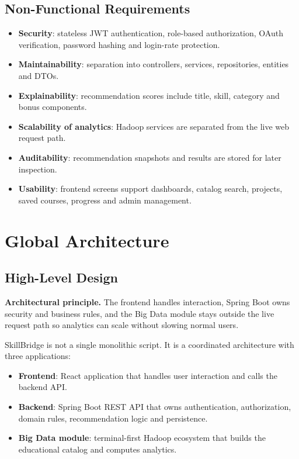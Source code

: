 \documentclass[12pt,a4paper]{report}
\newcommand{\reportnote}[2]{
    \begin{tcolorbox}[
        enhanced,
        colback=#1!10,
        colframe=#1,
        arc=2pt,
        boxrule=0.7pt,
        left=8pt,
        right=8pt,
        top=7pt,
        bottom=7pt
    ]
    #2
    \end{tcolorbox}
}
\newcommand{\projectName}{SkillBridge}
\begin{document}
\section{Non-Functional Requirements}
\begin{itemize}[leftmargin=*]
    \item \textbf{Security}: stateless JWT authentication, role-based authorization, OAuth verification, password hashing and login-rate protection.
    \item \textbf{Maintainability}: separation into controllers, services, repositories, entities and DTOs.
    \item \textbf{Explainability}: recommendation scores include title, skill, category and bonus components.
    \item \textbf{Scalability of analytics}: Hadoop services are separated from the live web request path.
    \item \textbf{Auditability}: recommendation snapshots and results are stored for later inspection.
    \item \textbf{Usability}: frontend screens support dashboards, catalog search, projects, saved courses, progress and admin management.
\end{itemize}

\chapter{Global Architecture}

\section{High-Level Design}
\reportnote{sbNavy}{\textbf{Architectural principle.} The frontend handles interaction, Spring Boot owns security and business rules, and the Big Data module stays outside the live request path so analytics can scale without slowing normal users.}

\projectName{} is not a single monolithic script. It is a coordinated architecture with three applications:

\begin{itemize}[leftmargin=*]
    \item \textbf{Frontend}: React application that handles user interaction and calls the backend API.
    \item \textbf{Backend}: Spring Boot REST API that owns authentication, authorization, domain rules, recommendation logic and persistence.
    \item \textbf{Big Data module}: terminal-first Hadoop ecosystem that builds the educational catalog and computes analytics.
\end{itemize}
\end{document}
